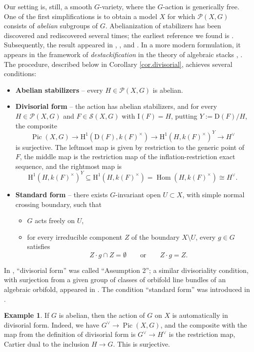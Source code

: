 \documentclass[12pt,reqno]{amsart}
\theoremstyle{plain}
\theoremstyle{remark}
\theoremstyle{definition}
\newtheorem{exam}[prop]{Example}
\numberwithin{equation}{section}
\newcommand{\rH}{{\mathrm H}}
\DeclareMathOperator{\Pic}{Pic}
\DeclareMathOperator{\Hom}{Hom}
\begin{document}
Our setting is, still, a smooth $G$-variety, where the $G$-action is generically free.
One of the first simplifications is to obtain a model $X$ for which $\mathcal{P}(X,G)$ consists of {\em abelian} subgroups of $G$. Abelianization of stabilizers has been discovered and rediscovered several times;
the earliest reference we found is \cite{bogomolov}. Subsequently, the result appeared in \cite{RYessential}, \cite{Bcan}, and \cite{BG}. 
In a more modern formulation, it appears in the framework of \emph{destackification} in the theory of algebraic stacks \cite{bergh},
\cite{berghrydh}. 
The procedure, described below in Corollary \ref{cor.divisorial}, achieves several conditions:
\begin{itemize}
\item {\bf Abelian stabilizers} --
every $H\in \mathcal{P}(X,G)$ is abelian. 
\item {\bf Divisorial form} --
the action has abelian stabilizers, and
for every $H\in \mathcal{P}(X,G)$ and $F\in \mathcal{S}(X,G)$ with $\mathrm{I}(F)=H$, putting $Y:=\mathrm{D}(F)/H$, the composite
\[
\Pic(X,G)\to \rH^1(\mathrm{D}(F), k(F)^\times )
\to \rH^1(H, k(F)^\times)^Y \to H^\vee
\]
is surjective.
The leftmost map is given by restriction to the generic point of $F$,
the middle map is the restriction map of the inflation-restriction exact sequence, and the rightmost map is
$$
\rH^1(H,k(F)^\times)^Y\subseteq \rH^1(H,k(F)^\times)=\Hom(H,k(F)^\times)\cong H^\vee.
$$
\item {\bf Standard form} -- there exists $G$-invariant open $U\subset X$, with simple normal crossing boundary, such that
\begin{itemize}
\item $G$ acts freely on $U$, 
\item for every irreducible component $Z$ of the boundary $X\setminus U$, every $g\in G$ satisfies
\[
Z\cdot g \cap Z = \emptyset \qquad \text{or} \qquad Z\cdot g=Z.
\]
\end{itemize}
\end{itemize}
In \cite{BnG},
``divisorial form'' was called ``Assumption 2''; a similar divisoriality condition, with surjection from a given group of classes of orbifold line bundles of an algebraic orbifold, appeared in \cite{Bbar}.
The condition ``standard form'' was introduced in \cite{RYessential}.

\begin{exam}
\label{exa.abeliandivisorial}
If $G$ is abelian, then the
action of $G$ on $X$ is automatically in divisorial form.
Indeed, we have $G^\vee\to \Pic(X,G)$,
and the composite with the map from the definition of divisorial form is
$G^\vee\to H^\vee$ is the restriction map, Cartier dual to the inclusion $H\to G$.
This is surjective.
\end{exam}
\end{document}
